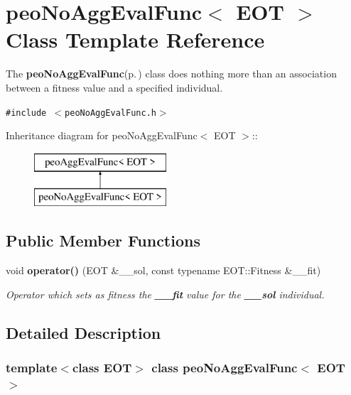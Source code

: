 \section{peo\-No\-Agg\-Eval\-Func$<$ EOT $>$ Class Template Reference}
\label{classpeo_no_agg_eval_func}
The {\bf peo\-No\-Agg\-Eval\-Func}{\rm (p.\,\pageref{classpeo_no_agg_eval_func})} class does nothing more than an association between a fitness value and a specified individual.  


{\tt \#include $<$peo\-No\-Agg\-Eval\-Func.h$>$}

Inheritance diagram for peo\-No\-Agg\-Eval\-Func$<$ EOT $>$::\begin{figure}[H]
\begin{center}
\leavevmode
\includegraphics[height=2cm]{classpeo_no_agg_eval_func}
\end{center}
\end{figure}
\subsection*{Public Member Functions}
\begin{CompactItemize}
\item 
void {\bf operator()} (EOT \&\_\-\_\-sol, const typename EOT::Fitness \&\_\-\_\-fit)\label{classpeo_no_agg_eval_func_1a69ee1af8745ac75c864bf884436de5}

\begin{CompactList}\small\item\em Operator which sets as fitness the {\bf \_\-\_\-fit} value for the {\bf \_\-\_\-sol} individual. \item\end{CompactList}\end{CompactItemize}


\subsection{Detailed Description}
\subsubsection*{template$<$class EOT$>$ class peo\-No\-Agg\-Eval\-Func$<$ EOT $>$}

